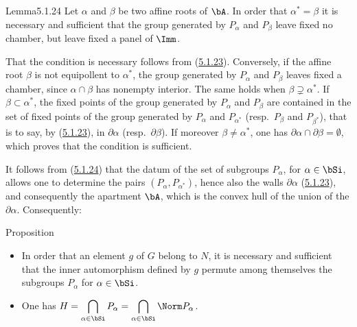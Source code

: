 \documentclass[12pt,a4paper,oneside,english]{smfart}
\makeatletter
\newcommand{\btanchor}[1]{\leavevmode\Hy@raisedlink{\hypertarget{bt:#1}{}}}
\newcommand{\btpageanchor}[1]{\Hy@raisedlink{\hypertarget{p:#1}{}}}
\newcommand{\btref}[1]{\hyperlink{bt:#1}{#1}}
\newcommand{\btpage}[1]{\marginnote{p.~#1}\btpageanchor{#1}}
\newcommand{\pg}[1]{\btpage{#1}}
\theoremstyle{definition}
\theoremstyle{bt}
\makeatother
\begin{document}
\begin{btstat}{Lemma}{5.1.24}\btanchor{5.1.24}
Let $\alpha$ and $\beta$ be two affine roots of $\bA$. In order that
$\alpha^{*}=\beta$ it is necessary and sufficient that the group generated by
$P_{\alpha}$ and $P_{\beta}$ leave fixed no chamber, but leave fixed a panel of
$\Imm$.
\end{btstat}

\pg{93}
That the condition is necessary follows from (\btref{5.1.23}). Conversely, if the affine
root $\beta$ is not equipollent to $\alpha^{*}$, the group generated by
$P_{\alpha}$ and $P_{\beta}$ leaves fixed a chamber, since $\alpha\cap\beta$ has
nonempty interior. The same holds when $\beta\supsetneq\alpha^{*}$. If
$\beta\subset\alpha^{*}$, the fixed points of the group generated by
$P_{\alpha}$ and $P_{\beta}$ are contained in the set of fixed points of the
group generated by $P_{\alpha}$ and $P_{\alpha^{*}}$ (resp.\ $P_{\beta}$ and
$P_{\beta^{*}}$), that is to say, by (\btref{5.1.23}), in $\partial\alpha$ (resp.\
$\partial\beta$). If moreover $\beta\neq\alpha^{*}$, one has
$\partial\alpha\cap\partial\beta=\emptyset$, which proves that the condition is
sufficient.

\btanchor{5.1.25}
It follows from (\btref{5.1.24}) that the datum of the set of subgroups $P_{\alpha}$,
for $\alpha\in\bSi$, allows one to determine the pairs
$(P_{\alpha},P_{\alpha^{*}})$, hence also the walls $\partial\alpha$ (\btref{5.1.23}),
and consequently the apartment $\bA$, which is the convex hull of the union of
the $\partial\alpha$. Consequently:

\begin{btstatu}{Proposition}
\upshape
\begin{itemize}\itshape
\item[(i)] In order that an element $g$ of $G$ belong to $N$, it is necessary
and sufficient that the inner automorphism defined by $g$ permute among
themselves the subgroups $P_{\alpha}$ for $\alpha\in\bSi$.
\item[(ii)] One has
$\displaystyle H=\bigcap_{\alpha\in\bSi}P_{\alpha}=\bigcap_{\alpha\in\bSi}\Norm P_{\alpha}$.
\end{itemize}
\end{btstatu}
\end{document}
